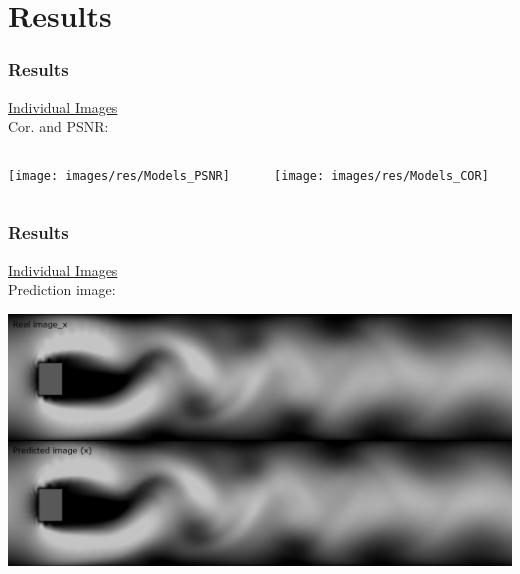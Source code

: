 \documentclass[18pt]{beamer}
\begin{document}
\section{Results}
\begin{frame}[t]
  \frametitle{Results}
  \vspace{-1cm}
  \begin{center}
    {\large \underline{Individual Images}} \\
    Cor. and PSNR:
  \end{center}
  \vspace{-1.3cm}
  \begin{columns}[t]
    \begin{column}{0.5\textwidth}
      \begin{center}
        \texttt{[image: images/res/Models\_PSNR]}
      \end{center}
    \end{column}
    \begin{column}{0.5\textwidth}
      \begin{center}
        \texttt{[image: images/res/Models\_COR]}
      \end{center}
    \end{column}
  \end{columns}
\end{frame}

\begin{frame}[t]
  \frametitle{Results}
  \vspace{-1cm}
  \begin{center}
    {\large \underline{Individual Images}} \\
    Prediction image:
  \end{center}

  \begin{center}
    \includegraphics[scale=0.32]{images/res/prediction}
  \end{center}  
\end{frame}
\end{document}
